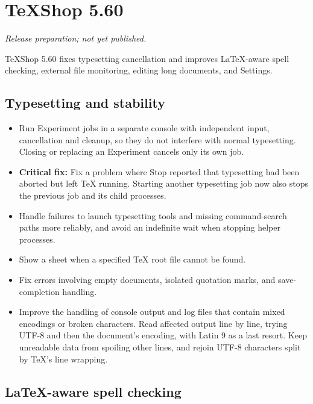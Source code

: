 \documentclass[11pt,letterpaper]{article}
\begin{document}
\section{TeXShop 5.60}

\noindent\textit{Release preparation; not yet published.}\par

TeXShop 5.60 fixes typesetting cancellation and improves LaTeX-aware spell checking, external file monitoring, editing long documents, and Settings.


\subsection{Typesetting and stability}

\begin{itemize}
\item Run Experiment jobs in a separate console with independent input, cancellation and cleanup, so they do not interfere with normal typesetting. Closing or replacing an Experiment cancels only its own job.
\item \textbf{Critical fix:} Fix a problem where Stop reported that typesetting had been aborted but left TeX running. Starting another typesetting job now also stops the previous job and its child processes.
\item Handle failures to launch typesetting tools and missing command-search paths more reliably, and avoid an indefinite wait when stopping helper processes.
\item Show a sheet when a specified TeX root file cannot be found.
\item Fix errors involving empty documents, isolated quotation marks, and save-completion handling.
\item Improve the handling of console output and log files that contain mixed encodings or broken characters. Read affected output line by line, trying UTF-8 and then the document’s encoding, with Latin 9 as a last resort. Keep unreadable data from spoiling other lines, and rejoin UTF-8 characters split by TeX’s line wrapping.
\end{itemize}

\subsection{LaTeX-aware spell checking}
\end{document}
